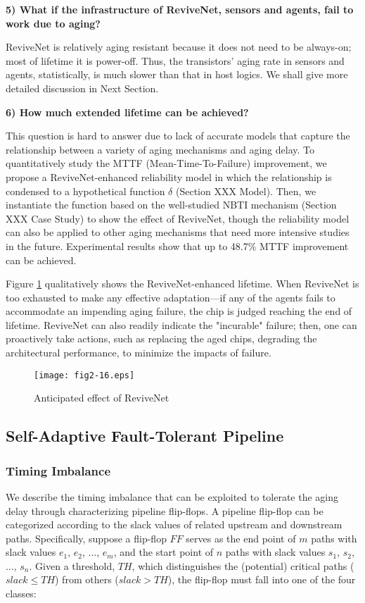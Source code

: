 {\bf 5) What if the infrastructure of ReviveNet, sensors and agents, fail to work due to aging?}

ReviveNet is relatively aging resistant because it does not need to be always-on; most of lifetime it is power-off. Thus, the transistors' aging rate in sensors and agents, statistically, is much slower than that in host logics. We shall give more detailed discussion in Next Section.


{\bf 6) How much extended lifetime can be achieved?}

This question is hard to answer due to lack of accurate models that capture the relationship between a variety of aging mechanisms and aging delay. To quantitatively study the MTTF (Mean-Time-To-Failure) improvement, we propose a ReviveNet-enhanced  reliability model in which the relationship is condensed to a hypothetical function $\delta$ (Section XXX Model). Then, we instantiate the function based on the well-studied NBTI mechanism (Section XXX Case Study) to show the effect of ReviveNet, though the reliability model can also be applied to other aging mechanisms that need more intensive studies in the future. Experimental results show that up to 48.7\% MTTF improvement can be achieved.


Figure \ref{curve} qualitatively shows the ReviveNet-enhanced lifetime. When ReviveNet is too exhausted to make any effective adaptation---if any of the agents fails to accommodate an impending aging failure, the chip is judged reaching the end of lifetime. ReviveNet can also readily indicate the "incurable" failure; then, one can proactively take actions, such as replacing the aged chips, degrading the architectural performance, to minimize the impacts of failure.


\begin{figure}[t]
\centering
\texttt{[image: fig2-16.eps]}%
   \caption{Anticipated effect of ReviveNet}\label{curve}
\end{figure}

\subsection{Self-Adaptive Fault-Tolerant Pipeline}
\subsubsection{Timing Imbalance}
We describe the timing imbalance that can be exploited to tolerate the aging delay through characterizing pipeline flip-flops. A pipeline flip-flop can be categorized according to the slack values of related upstream and downstream paths. Specifically, suppose a flip-flop $FF$ serves as the end point of $m$ paths with slack values $e_1$, $e_2$, $\ldots$, $e_m$, and the start point of $n$ paths with slack values $s_1$, $s_2$, $\ldots$, $s_n$. Given a threshold, $TH$, which distinguishes the (potential) critical paths ($slack \leq TH$) from others ($slack > TH$), the flip-flop must fall into one of the four classes:

